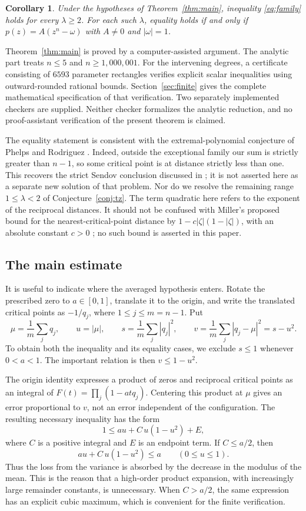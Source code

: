 \documentclass[11pt,letterpaper,reqno]{amsart}
\newtheorem{cor}[thm]{Corollary}
\theoremstyle{definition}
\numberwithin{equation}{section}
\begin{document}
\begin{cor}\label{cor:powers}
Under the hypotheses of Theorem~\ref{thm:main}, inequality \eqref{eq:family} holds for every $\lambda\ge2$. For each such $\lambda$, equality holds if and only if $p(z)=A(z^n-\omega)$ with $A\ne0$ and $|\omega|=1$.
\end{cor}

Theorem~\ref{thm:main} is proved by a computer-assisted argument. The analytic part treats $n\le5$ and $n\ge1{,}000{,}001$. For the intervening degrees, a certificate consisting of $6593$ parameter rectangles verifies explicit scalar inequalities using outward-rounded rational bounds. Section~\ref{sec:finite} gives the complete mathematical specification of that verification. Two separately implemented checkers are supplied. Neither checker formalizes the analytic reduction, and no proof-assistant verification of the present theorem is claimed.

The equality statement is consistent with the extremal-polynomial conjecture of Phelps and Rodriguez \cite[p.~174, following Theorem~5]{PR72}. Indeed, outside the exceptional family our sum is strictly greater than $n-1$, so some critical point is at distance strictly less than one. This recovers the strict Sendov conclusion discussed in \cite[Section~3]{Tao26}; it is not asserted here as a separate new solution of that problem. Nor do we resolve the remaining range $1\le\lambda<2$ of Conjecture~\ref{conj:tz}. The term quadratic here refers to the exponent of the reciprocal distances. It should not be confused with Miller's proposed bound for the nearest-critical-point distance by $1-c|\zeta|(1-|\zeta|)$, with an absolute constant $c>0$ \cite[p.~2, Conjecture~1]{Mil25}; no such bound is asserted in this paper.

\subsection*{The main estimate}
It is useful to indicate where the averaged hypothesis enters. Rotate the prescribed zero to $a\in[0,1]$, translate it to the origin, and write the translated critical points as $-1/q_j$, where $1\le j\le m=n-1$. Put
\[
 \mu=\frac1m\sum_jq_j,\qquad u=|\mu|,\qquad
 s=\frac1m\sum_j|q_j|^2,\qquad
 v=\frac1m\sum_j|q_j-\mu|^2=s-u^2.
\]
To obtain both the inequality and its equality cases, we exclude $s\le1$ whenever $0<a<1$. The important relation is then $v\le1-u^2$.

The origin identity expresses a product of zeros and reciprocal critical points as an integral of $F(t)=\prod_j(1-atq_j)$. Centering this product at $\mu$ gives an error proportional to $v$, not an error independent of the configuration. The resulting necessary inequality has the form
\[
 1\le au+C\,u(1-u^2)+E,
\]
where $C$ is a positive integral and $E$ is an endpoint term. If $C\le a/2$, then
\[
 au+C\,u(1-u^2)\le a\qquad(0\le u\le1).
\]
Thus the loss from the variance is absorbed by the decrease in the modulus of the mean. This is the reason that a high-order product expansion, with increasingly large remainder constants, is unnecessary. When $C>a/2$, the same expression has an explicit cubic maximum, which is convenient for the finite verification.
\end{document}
